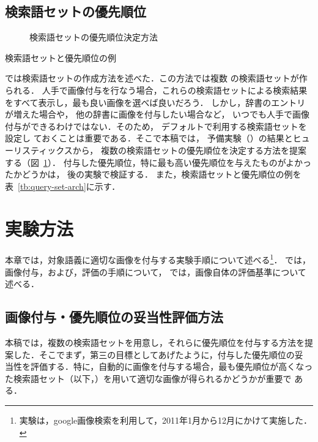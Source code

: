 \documentclass[japanese]{jnlp_1.4}
\newcommand{\best}{}
\newcommand{\refsec}[1]{}
\begin{document}
\subsection{検索語セットの優先順位}
\label{sec:query-order}

\begin{figure}[b]

\caption{検索語セットの優先順位決定方法}
\label{fig:query-order}
\end{figure}
\begin{table}[b]
\caption{検索語セットと優先順位の例} 
\label{tb:query-set-arch}

\end{table}


\refsec{sec:queryset}では検索語セットの作成方法を述べた．この方法では複数
の検索語セットが作られる．
人手で画像付与を行なう場合，これらの検索語セットによる検索結果
をすべて表示し，最も良い画像を選べば良いだろう．
しかし，辞書のエントリが増えた場合や，
他の辞書に画像を付与したい場合など，
いつでも人手で画像付与ができるわけではない．そのため，
デフォルトで利用する検索語セットを設定し
ておくことは重要である．そこで本稿では，
予備実験（\refsec{sec:pre-exp}）の結果とヒューリスティックスから，
複数の検索語セットの優先順位を決定する方法を提案する（図~\ref{fig:query-order}）．
付与した優先順位，特に最も高い優先順位を与えたものがよかったかどうかは，
後の実験で検証する．
また，検索語セットと優先順位の例を表~\ref{tb:query-set-arch}に示す．


\section{実験方法}
\label{sec:all-lxd-exp}

本章では，対象語義に適切な画像を付与する実験手順について述べる\footnote{実験は，google画像検索を利用して，2011年1月から12月にかけて実施した．}．
\refsec{sec:exp-steps}では，画像付与，および，評価の手順について，
\refsec{sec:exp-eva}では，画像自体の評価基準について述べる．


\subsection{画像付与・優先順位の妥当性評価方法}
\label{sec:exp-steps}

本稿では，複数の検索語セットを用意し，それらに優先順位を付与する方法を提
案した．そこでまず，第三の目標としてあげたように，付与した優先順位の妥
当性を評価する．特に，自動的に画像を付与する場合，最も優先順位が高くなっ
た検索語セット（以下，\best{}）を用いて適切な画像が得られるかどうかが重要で
ある．
\end{document}
